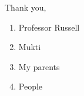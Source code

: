 
Thank you, \begin{enumerate}
  \item Professor Russell
  \item Mukti
  \item My parents
  \item People 
\end{enumerate}

